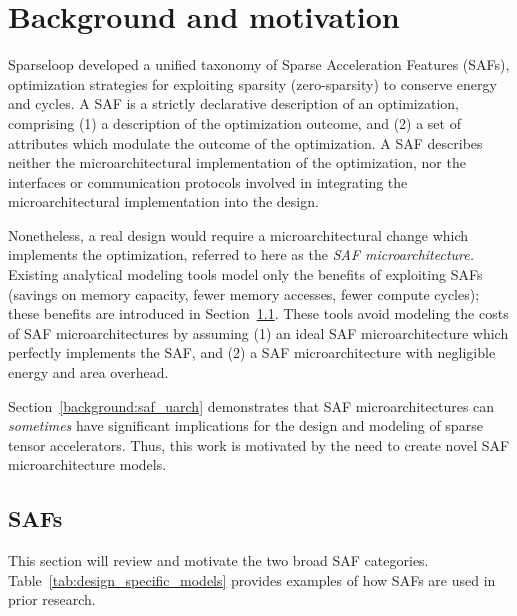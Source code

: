 \chapter{Background and motivation}

Sparseloop\cite{sparseloop} developed a unified taxonomy of Sparse Acceleration Features (SAFs), optimization strategies for exploiting sparsity (zero-sparsity) to conserve energy and cycles. A SAF is a strictly declarative description of an optimization, comprising (1) a description of the optimization outcome, and (2) a set of attributes which modulate the outcome of the optimization. A SAF describes neither the microarchitectural implementation of the optimization, nor the interfaces or communication protocols involved in integrating the microarchitectural implementation into the design. 

Nonetheless, a real design would require a microarchitectural change which implements the optimization, referred to here as the \textit{SAF microarchitecture.} Existing analytical modeling tools\cite{sparseloop} model only the benefits of exploiting SAFs (savings on memory capacity, fewer memory accesses, fewer compute cycles); these benefits are introduced in Section~\ref{background:safs}. These tools avoid modeling the costs of SAF microarchitectures by assuming (1) an ideal SAF microarchitecture which perfectly implements the SAF, and (2) a SAF microarchitecture with negligible energy and area overhead.

Section~\ref{background:saf_uarch} demonstrates that SAF microarchitectures can \textit{sometimes} have significant implications for the design and modeling of sparse tensor accelerators. Thus, this work is motivated by the need to create novel SAF microarchitecture models.
%
%
\section{SAFs}
\label{background:safs}

This section will review and motivate the two broad SAF categories. Table~\ref{tab:design_specific_models} provides examples of how SAFs are used in prior research.

